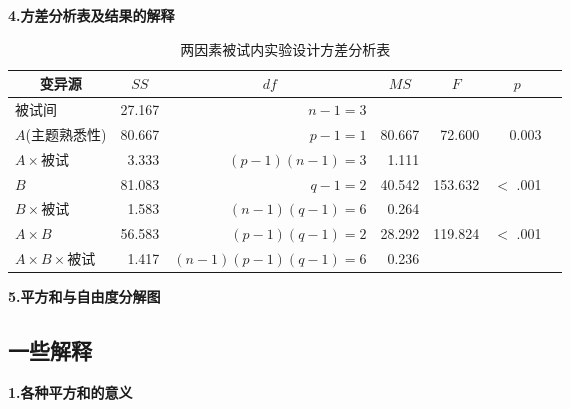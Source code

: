 \textbf{4.方差分析表及结果的解释}
\begin{table*}
	\centering
	\caption{两因素被试内实验设计方差分析表}
	{
                    \begin{tabular}{lrrrrrr}
		    \toprule
			\multicolumn{1}{c}{变异源} & \multicolumn{1}{c}{$SS$} & \multicolumn{1}{c}{$df$} & \multicolumn{1}{c}{$MS$} & \multicolumn{1}{c}{$F$} & \multicolumn{1}{c}{$p$} \\
		     \midrule
			被试间                 & 27.167    & $n-1=3$     &     &  &    \\
		      \midrule
			$A$(主题熟悉性)        & 80.667    & $p-1=1$     & 80.667  & 72.600 & 0.003  \\
			$A\times$被试          & 3.333     & $(p-1)(n-1)=3$     & 1.111   &  &    \\
			$B$                    & 81.083    & $q-1=2$     & 40.542 & 153.632 & $<$ .001  \\
			$B\times$被试          & 1.583     & $(n-1)(q-1)=6$     & 0.264   &  &    \\
			$A \times B$           & 56.583    & $(p-1)(q-1)=2$     & 28.292  & 119.824 & $<$ .001  \\
			$A\times B \times$被试 & 1.417     & $(n-1)(p-1)(q-1)=6$     & 0.236   &  &    \\
		      \bottomrule
		\end{tabular}
	}
\end{table*}


\textbf{5.平方和与自由度分解图}

\subsection{一些解释}
\textbf{1.各种平方和的意义}



